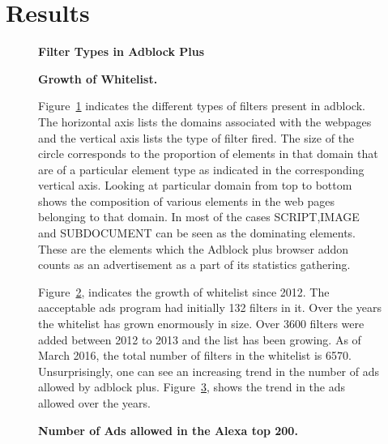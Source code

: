 \section{Results}
\begin{figure}
	\centering
	\vspace*{-0.5cm}
	\caption{\textbf{Filter Types in Adblock Plus}}
	\label{fig:abp-filters}
	\vspace*{-0.5cm}
\end{figure}
\begin{figure}
	\centering
	\vspace*{-0.5cm}
	\caption{\textbf{Growth of Whitelist.}}
	\label{fig:growth}
	\vspace*{-0.5cm}
\end{figure}
\begin{figure}
Figure~\ref{fig:abp-filters} indicates the different types of filters  present in adblock.
The horizontal axis lists the domains associated with the webpages and the vertical axis lists the type of filter fired. The size of the circle corresponds to  the proportion of elements in that domain that are of a particular element type as indicated in the corresponding vertical axis. Looking at  particular domain from top to bottom shows the composition of various elements in the web pages belonging to that domain. In most of the cases  SCRIPT,IMAGE and SUBDOCUMENT can be seen as the dominating elements. These are the elements which the Adblock plus browser addon counts as an advertisement as a part of its statistics gathering.

Figure~\ref{fig:growth}, indicates the growth of whitelist since 2012. The aacceptable ads program had initially 132 filters in it. Over the years the whitelist has grown enormously in  size.  Over 3600 filters were added  between 2012 to 2013 and the list has been growing. As of March 2016, the total number of  filters in the whitelist is 6570.
Unsurprisingly, one can see an increasing trend in the number of ads allowed by adblock plus.
Figure~\ref{fig:ads-allowed}, shows the trend in the ads allowed over the years.

	\centering
	\vspace*{-0.5cm}
	\caption{\textbf{Number of Ads allowed in the Alexa top 200.}}
	\label{fig:ads-allowed}
	\vspace*{-0.5cm}
\end{figure}

